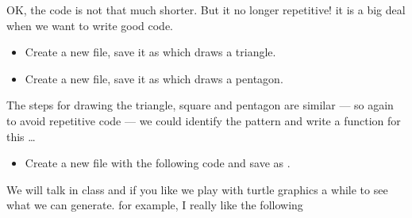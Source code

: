 \documentclass{coderdojo}
\begin{document}
OK, the code is not that much shorter. But it no longer repetitive! it is a big deal when we want to write good code.


\begin{itemize}
\item[\todoSymbol] \color{todo}
Create a new file, save it as  which draws a triangle.
\item[\todoSymbol] \color{todo}
Create a new file, save it as  which draws a pentagon.
\end{itemize}

\clearpage

The steps for drawing the triangle, square and pentagon are similar --- so again to avoid repetitive code --- we could identify the pattern and write a function for this \ldots 
\begin{itemize}
\item[\todoSymbol] \color{todo}
Create a new file with the following code and save as .
\end{itemize}



We will talk in class and if you like we play with turtle graphics a while to see what we can generate. for example, I really like the following 
 
\end{document}
